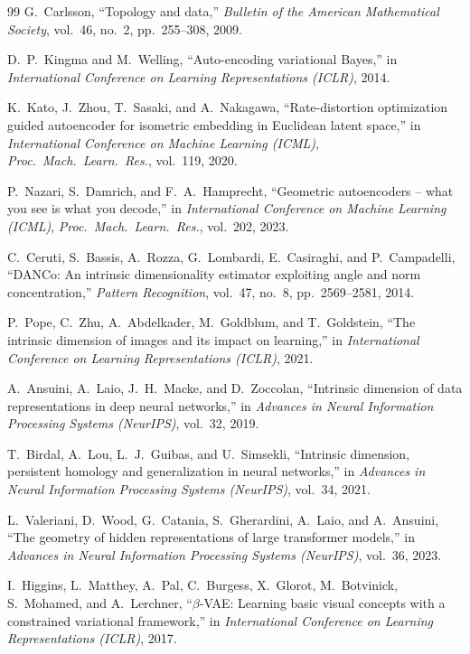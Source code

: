 \documentclass[11pt,a4paper]{jsarticle}
\begin{document}
\begin{thebibliography}{99}
G.~Carlsson,
``Topology and data,''
\textit{Bulletin of the American Mathematical Society},
vol.~46, no.~2, pp.~255--308, 2009.

D.~P.~Kingma and M.~Welling,
``Auto-encoding variational Bayes,''
in \textit{International Conference on Learning Representations (ICLR)}, 2014.

K.~Kato, J.~Zhou, T.~Sasaki, and A.~Nakagawa,
``Rate-distortion optimization guided autoencoder for isometric embedding
in Euclidean latent space,''
in \textit{International Conference on Machine Learning (ICML)},
\textit{Proc.~Mach.~Learn.~Res.}, vol.~119, 2020.

P.~Nazari, S.~Damrich, and F.~A.~Hamprecht,
``Geometric autoencoders -- what you see is what you decode,''
in \textit{International Conference on Machine Learning (ICML)},
\textit{Proc.~Mach.~Learn.~Res.}, vol.~202, 2023.

C.~Ceruti, S.~Bassis, A.~Rozza, G.~Lombardi, E.~Casiraghi, and P.~Campadelli,
``DANCo: An intrinsic dimensionality estimator exploiting angle and norm concentration,''
\textit{Pattern Recognition}, vol.~47, no.~8, pp.~2569--2581, 2014.

P.~Pope, C.~Zhu, A.~Abdelkader, M.~Goldblum, and T.~Goldstein,
``The intrinsic dimension of images and its impact on learning,''
in \textit{International Conference on Learning Representations (ICLR)}, 2021.

A.~Ansuini, A.~Laio, J.~H.~Macke, and D.~Zoccolan,
``Intrinsic dimension of data representations in deep neural networks,''
in \textit{Advances in Neural Information Processing Systems (NeurIPS)},
vol.~32, 2019.

T.~Birdal, A.~Lou, L.~J.~Guibas, and U.~Simsekli,
``Intrinsic dimension, persistent homology and generalization
in neural networks,''
in \textit{Advances in Neural Information Processing Systems (NeurIPS)},
vol.~34, 2021.

L.~Valeriani, D.~Wood, G.~Catania, S.~Gherardini, A.~Laio, and A.~Ansuini,
``The geometry of hidden representations of large transformer models,''
in \textit{Advances in Neural Information Processing Systems (NeurIPS)},
vol.~36, 2023.

I.~Higgins, L.~Matthey, A.~Pal, C.~Burgess, X.~Glorot, M.~Botvinick,
S.~Mohamed, and A.~Lerchner,
``$\beta$-VAE: Learning basic visual concepts with a constrained variational framework,''
in \textit{International Conference on Learning Representations (ICLR)}, 2017.


\end{thebibliography}
\end{document}
